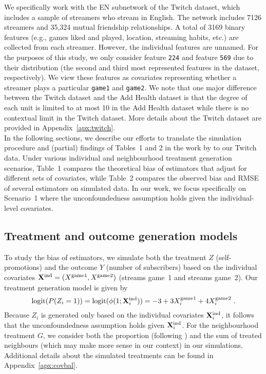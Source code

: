 \documentclass[10pt]{article}
\begin{document}
We specifically work with the EN subnetwork of the Twitch dataset, which includes a sample of streamers who stream in English. The network includes 7126 streamers and 35,324 mutual friendship relationships. A total of 3169 binary features (e.g., games liked and played, location, streaming habits, etc.) are collected from each streamer. However, the individual features are unnamed. For the purposes of this study, we only consider feature \verb|224| and feature \verb|569| due to their distribution (the second and third most represented features in the dataset, respectively). We view these features as covariates representing whether a streamer plays a particular \verb|game1| and \verb|game2|. We note that one major difference between the Twitch dataset and the Add Health dataset is that the degree of each unit is limited to at most 10 in the Add Health dataset while there is no contextual limit in the Twitch dataset. More details about the Twitch dataset are provided in Appendix~\ref{apx:twitch}.
\\

In the following sections, we describe our efforts to translate the simulation procedure and (partial) findings of Tables~1 and 2 in the work by \textcite{Forastiere:2021} to our Twitch data. Under various individual and neighbourhood treatment generation scenarios, Table~1 compares the theoretical bias of estimators that adjust for different sets of covariates, while Table~2 compares the observed bias and RMSE of several estimators on simulated data. In our work, we focus specifically on Scenario~1 where the unconfoundedness assumption holds given the individual-level covariates.

\subsection{Treatment and outcome generation models} \label{sec:models}

To study the bias of estimators, we simulate both the treatment $Z$ (self-promotions) and the outcome $Y$ (number of subscribers) based on the individual covariates $\mathbf{X}^{\text{ind}}=(X^\text{game1},X^\text{game2})$ (streams game~1 and streams game~2). Our treatment generation model is given by
\[
\text{logit}(P(Z_i=1)) = \text{logit}(\phi(1;\mathbf{X}^{\text{ind}}_i)) = -3 + 3X_i^\text{game1} + 4X_i^\text{game2} \;.
\]
Because $Z_i$ is generated only based on the individual covariates $\mathbf{X}^{\text{ind}}_i$, it follows that the unconfoundedness assumption holds given $\mathbf{X}^{\text{ind}}_i$. For the neighbourhood treatment $G$, we consider both the proportion (following \citeauthor{Forastiere:2021}) and the sum of treated neighbours (which may make more sense in our context) in our simulations. Additional details about the simulated treatments can be found in Appendix~\ref{apx:covbal}.
\\
\end{document}
